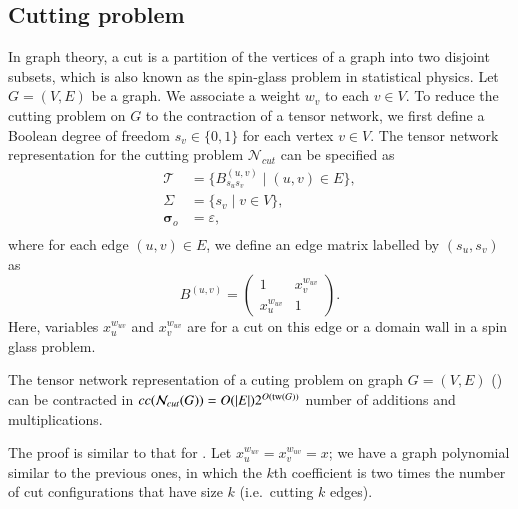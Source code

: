 \documentclass[review, onefignum, onetabnum]{siamart190516}
\begin{document}
\subsection{Cutting problem}
In graph theory, a cut is a partition of the vertices of a graph into two disjoint subsets,
which is also known as the spin-glass problem in statistical physics.
Let $G=(V,E)$ be a graph. We associate a weight $w_v$ to each $v\in V$. To reduce the cutting problem on $G$ to the contraction of a tensor network, we first define a Boolean degree of freedom $s_v\in\{0, 1\}$ for each vertex $v\in V$.
The tensor network representation for the cutting problem $\mathcal{N}_{cut}$ can be specified as
\begin{equation}\label{eq:cuttensornetwork}
\begin{split}
    \mathcal{T} &= \{B^{(u, v)}_{s_us_v} \mid (u, v) \in E\},\\
    \Sigma &= \{s_v \mid v \in V\},\\
    \boldsymbol{\sigma}_o &= \varepsilon,\\
\end{split}
\end{equation}
where for each edge $(u,v)\in E$, we define an edge matrix labelled by $(s_u, s_v)$ as
\begin{equation}
    B^{(u, v)} = \left(\begin{matrix}
        1 & x_{v}^{w_{uv}}\\
        x_{u}^{w_{uv}} & 1
    \end{matrix}\right).
\end{equation}
Here, variables $x_u^{w_{uv}}$ and $x_v^{w_{uv}}$ are for a cut on this edge or a domain wall in a spin glass problem.
\begin{theorem}\label{thm:colorcomplex}
    The tensor network representation of a cuting problem on graph $G=(V,E)$ () can be contracted in $cc(\mathcal{N}_{cut}(G)) = O(|E|)2^{O({\rm tw}(G))}$ number of additions and multiplications.
\end{theorem}
The proof is similar to that for .
Let $x_u^{w_{uv}} = x_v^{w_{uv}} = x$; we have a graph polynomial similar to the previous ones,
in which the $k$th coefficient is two times the number of cut configurations that have size $k$ (i.e.\ cutting $k$ edges).
\end{document}
